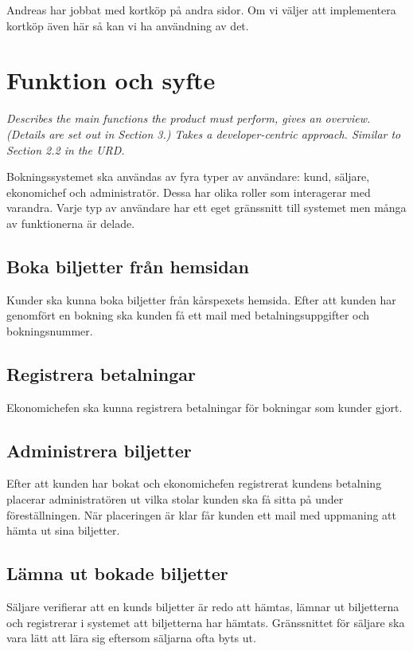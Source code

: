 \documentclass[a4paper, twoside, 11pt, titlepage]{article}
\begin{document}
Andreas har jobbat med kortköp på andra sidor. Om vi väljer att implementera kortköp även här så kan vi ha användning av det.

\clearpage
\section{Funktion och syfte}


\emph{Describes the main functions the product must perform, gives an overview. (Details are set out in Section 3.) Takes a developer-centric approach. Similar to Section 2.2 in the URD.}

Bokningssystemet ska användas av fyra typer av användare: kund, säljare, ekonomichef och administratör. Dessa har olika roller som interagerar med varandra. Varje typ av användare har ett eget gränssnitt till systemet men många av funktionerna är delade.

	\subsection{Boka biljetter från hemsidan}


	Kunder ska kunna boka biljetter från kårspexets hemsida. Efter att kunden har genomfört en bokning ska kunden få ett mail med betalningsuppgifter och bokningsnummer.

	\subsection{Registrera betalningar}


	Ekonomichefen ska kunna registrera betalningar för bokningar som kunder gjort.

	\subsection{Administrera biljetter}


	Efter att kunden har bokat och ekonomichefen registrerat kundens betalning placerar administratören ut vilka stolar kunden ska få sitta på under föreställningen. När placeringen är klar får kunden ett mail med uppmaning att hämta ut sina biljetter.

	\subsection{Lämna ut bokade biljetter}


	Säljare verifierar att en kunds biljetter är redo att hämtas, lämnar ut biljetterna och registrerar i systemet att biljetterna har hämtats. Gränssnittet för säljare ska vara lätt att lära sig eftersom säljarna ofta byts ut.
\end{document}

